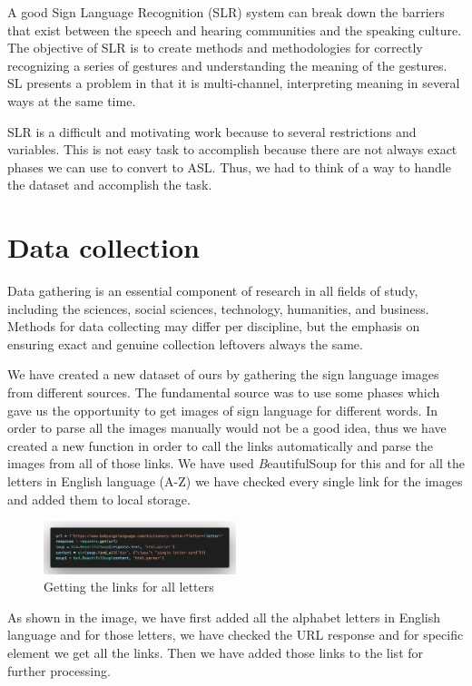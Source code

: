 \documentclass[twocolumn,10pt]{asme2ej}
\begin{document}
A good Sign Language Recognition (SLR) system can break down the barriers that exist between the speech and hearing communities and the speaking culture. The objective of SLR is to create methods and methodologies for correctly recognizing a series of gestures and understanding the meaning of the gestures. SL presents a problem in that it is multi-channel, interpreting meaning in several ways at the same time.

SLR is a difficult and motivating work because to several restrictions and variables. This is not easy task to accomplish because there are not always exact phases we can use to convert to ASL. Thus, we had to think of a way to handle the dataset and accomplish the task. 

\section{Data collection}

Data gathering is an essential component of research in all fields of study, including the sciences, social sciences, technology, humanities, and business. Methods for data collecting may differ per discipline, but the emphasis on ensuring exact and genuine collection leftovers always the same.

We have created a new dataset of ours by gathering the sign language images from different sources. The fundamental source was to use some phases which gave us the opportunity to get images of sign language for different words. In order to parse all the images manually would not be a good idea, thus we have created a new function in order to call the links automatically and parse the images from all of those links. We have used {\emph BeautifulSoup} for this and for all the letters in English language (A-Z) we have checked every single link for the images and added them to local storage. 

\begin{figure}[h]
    \centering
    \includegraphics[width=0.5\textwidth]{figure/fig1.png}
    \caption{Getting the links for all letters}
    \label{fig:mesh1}
\end{figure}
As shown in the image, we have first added all the alphabet letters in English language and for those letters, we have checked the URL response and for specific element we get all the links. Then we have added those links to the list for further processing. 
\end{document}
